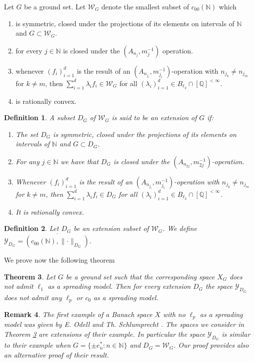 \documentclass[a4paper]{amsart}
\theoremstyle{plain}
\newtheorem{theorem}{Theorem}[section]
\newtheorem{definition}[theorem]{Definition}
\newtheorem{remark}[theorem]{Remark}
\newcommand{\N}{\mathbb{N}}
\newcommand{\Q}{\mathbb{Q}}
\newcommand{\mc}{\mathcal}
\newcommand{\norm}[1][\cdot]{\lVert #1\rVert}
\begin{document}
Let $G$ be a ground set.
Let $\mathcal{W}_{G}$ denote the smallest subset of $c_{00}(\N)$ which
\begin{enumerate}
 \item is symmetric, closed under the projections of its elements on intervals of $\N$ and  $G\subset\mathcal{W}_{G}$.
 \item  for every $j\in\N$ is closed under the $(A_{n_j}, m_{j}^{-1})$ operation.
 \item whenever $(f_{i})_{i=1}^{d}$ is the result  of an
$(A_{n_{j_i}},m_{j_i}^{-1})$-operation  with $n_{j_k}\ne n_{j_{m}}$ for $k\neq m$,  then
$\sum_{i=1}^{d}\lambda_{i}f_{i}\in \mathcal{W}_{G}$ for all $(\lambda_{i})_{i=1}^{d}\in
B_{\ell_2}\cap [\Q]^{<\infty}$.
 \item is rationally convex.
\end{enumerate}
\begin{definition}\label{trcomp}
A subset $D_{G}$ of $\mathcal{W}_{G}$ is said to be an extension of $G$ if:
 \begin{enumerate}
 \item[(i)]  The set  $D_{G}$ is symmetric, closed under the projections of its elements
on intervals of $\N$ and  $G\subset D_G$.
 \item[(ii)] For any $j\in\N$ we have that $D_{G}$ is  closed under the $(A_{n_{2j}},m_{2j}^{-1})$-operation.
\item[(iii)] Whenever $(f_{i})_{i=1}^{d}$ is the result  of an
$(A_{n_{j_i}},m_{j_i}^{-1})$-operation  with $n_{j_k}\ne n_{j_{m}}$ for $k\neq m$,  then
$\sum_{i=1}^{d}\lambda_{i}f_{i}\in D_{G}$ for all $(\lambda_{i})_{i=1}^{d}\in
B_{\ell_2}\cap [\Q]^{<\infty}$. \item[iv)] It  is rationally convex.
\end{enumerate}
 \end{definition}
\begin{definition}\label{norm1}
 Let $D_{G}$ be an extension subset of $\mc{W}_{G}$.
We define $\mathcal{Y}_{D_{G}}=\overline{(c_{00}(\N),\norm_{D_{G}})}$.
\end{definition}
We prove now the following theorem
\begin{theorem}\label{t11.3}
Let $G$ be a ground set  such that the corresponding space $X_{G}$ does not admit
$\ell_{1}$ as a spreading model. Then for every extension $D_{G}$ the space $\mc{Y}_{D_G}$ does not admit any $\ell_p$ or $c_0$ as a spreading model.
\end{theorem}
\begin{remark}
The first example of a Banach space $X$ with no $\ell_{p}$ as a spreading model was given
by E. Odell and Th. Schlumprecht \cite{OSsm}.  The spaces we consider in Theorem
\ref{t11.3} are extensions of their example. In particular  the space $\mc{Y}_{D_G}$
is similar to their example when  $G=\{\pm e_{n}^{*}: n\in\N\}$ and  $D_{G}=\mc{W}_{G}$.  Our proof provides also an alternative proof of their result.
\end{remark}
\end{document}
